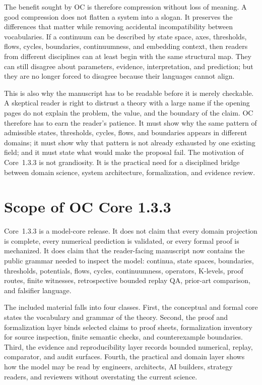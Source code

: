 The benefit sought by OC is therefore compression without loss of meaning. A
good compression does not flatten a system into a slogan. It preserves the
differences that matter while removing accidental incompatibility between
vocabularies. If a continuum can be described by state space, axes, thresholds,
flows, cycles, boundaries, continuumness, and embedding context, then readers
from different disciplines can at least begin with the same structural map.
They can still disagree about parameters, evidence, interpretation, and
prediction; but they are no longer forced to disagree because their languages
cannot align.

This is also why the manuscript has to be readable before it is merely
checkable. A skeptical reader is right to distrust a theory with a large name if
the opening pages do not explain the problem, the value, and the boundary of
the claim. OC therefore has to earn the reader's patience. It must show why the
same pattern of admissible states, thresholds, cycles, flows, and boundaries
appears in different domains; it must show why that pattern is not already
exhausted by one existing field; and it must state what would make the proposal
fail. The motivation of Core~1.3.3 is not grandiosity. It is the practical need
for a disciplined bridge between domain science, system architecture,
formalization, and evidence review.

\section{Scope of OC Core 1.3.3}
\label{sec:r012-scope}

Core~1.3.3 is a model-core release. It does not claim that every domain
projection is complete, every numerical prediction is validated, or every
formal proof is mechanized. It does claim that the reader-facing manuscript now
contains the public grammar needed to inspect the model: continua, state
spaces, boundaries, thresholds, potentials, flows, cycles, continuumness,
operators, K-levels, proof routes, finite witnesses, retrospective bounded replay QA,
prior-art comparison, and falsifier language.

The included material falls into four classes. First, the conceptual and formal
core states the vocabulary and grammar of the theory. Second, the proof and
formalization layer binds selected claims to proof sheets, formalization inventory for source inspection,
finite semantic checks, and counterexample boundaries. Third, the evidence and
reproducibility layer records bounded numerical, replay, comparator, and audit
surfaces. Fourth, the practical and domain layer shows how the model may be read
by engineers, architects, AI builders, strategy readers, and reviewers without
overstating the current science.

